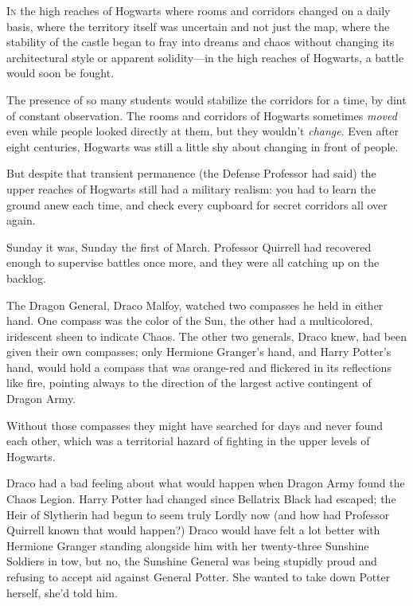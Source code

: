 
\lettrine{I}{n} the high reaches of Hogwarts where rooms and corridors changed on a daily basis, where the territory itself was uncertain and not just the map, where the stability of the castle began to fray into dreams and chaos without changing its architectural style or apparent solidity—in the high reaches of Hogwarts, a battle would soon be fought.

The presence of so many students would stabilize the corridors for a time, by dint of constant observation. The rooms and corridors of Hogwarts sometimes \emph{moved} even while people looked directly at them, but they wouldn't \emph{change}. Even after eight centuries, Hogwarts was still a little shy about changing in front of people.

But despite that transient permanence (the Defense Professor had said) the upper reaches of Hogwarts still had a military realism: you had to learn the ground anew each time, and check every cupboard for secret corridors all over again.

Sunday it was, Sunday the first of March. Professor Quirrell had recovered enough to supervise battles once more, and they were all catching up on the backlog.

The Dragon General, Draco Malfoy, watched two compasses he held in either hand. One compass was the color of the Sun, the other had a multicolored, iridescent sheen to indicate Chaos. The other two generals, Draco knew, had been given their own compasses; only Hermione Granger's hand, and Harry Potter's hand, would hold a compass that was orange-red and flickered in its reflections like fire, pointing always to the direction of the largest active contingent of Dragon Army.

Without those compasses they might have searched for days and never found each other, which was a territorial hazard of fighting in the upper levels of Hogwarts.

Draco had a bad feeling about what would happen when Dragon Army found the Chaos Legion. Harry Potter had changed since Bellatrix Black had escaped; the Heir of Slytherin had begun to seem truly Lordly now (and how had Professor Quirrell known that would happen?) Draco would have felt a lot better with Hermione Granger standing alongside him with her twenty-three Sunshine Soldiers in tow, but no, the Sunshine General was being stupidly proud and refusing to accept aid against General Potter. She wanted to take down Potter herself, she'd told him.

